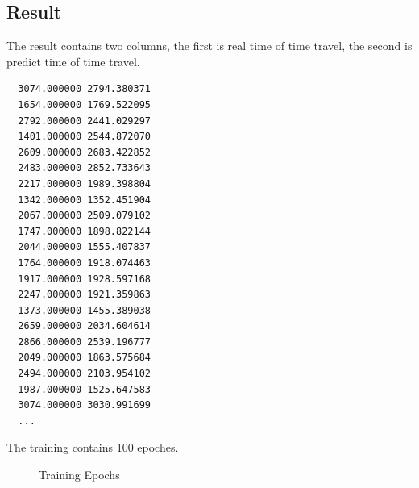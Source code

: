 \documentclass[fontset=none]{ctexart}
\theoremstyle{definition}
\theoremstyle{remark}
\begin{document}
\subsection{Result}
The result contains two columns, the first is real time of time travel, the second is predict time of time travel.
\begin{verbatim}
  3074.000000 2794.380371
  1654.000000 1769.522095
  2792.000000 2441.029297
  1401.000000 2544.872070
  2609.000000 2683.422852
  2483.000000 2852.733643
  2217.000000 1989.398804
  1342.000000 1352.451904
  2067.000000 2509.079102
  1747.000000 1898.822144
  2044.000000 1555.407837
  1764.000000 1918.074463
  1917.000000 1928.597168
  2247.000000 1921.359863
  1373.000000 1455.389038
  2659.000000 2034.604614
  2866.000000 2539.196777
  2049.000000 1863.575684
  2494.000000 2103.954102
  1987.000000 1525.647583
  3074.000000 3030.991699
  ...
\end{verbatim}
The training contains 100 epoches.
\begin{figure}[h]
  \centering
  \quad
  \quad
  \caption{Training Epochs}
  \label{fig: deepTTEepochs}
\end{figure}
\end{document}
